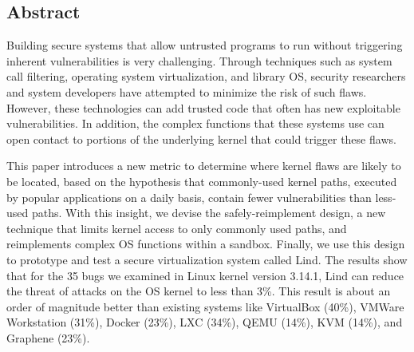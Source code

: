 \subsection*{Abstract}
Building secure systems that allow untrusted programs to run without
triggering inherent vulnerabilities %
is very challenging.
Through techniques such as system call filtering,
operating system virtualization, and library OS, security researchers
and system developers have attempted to minimize the risk of such flaws.
However, these technologies can add trusted code that often has new
exploitable vulnerabilities. 
In addition, the complex functions that these systems use can open contact 
to portions of the underlying kernel that could trigger these flaws.

This paper introduces a new metric to determine where kernel flaws are
likely to be located, based on the  hypothesis that commonly-used kernel
paths, executed by popular applications on a daily basis, contain fewer
vulnerabilities than less-used paths. With this insight, we devise the
safely-reimplement design, a new technique that limits kernel access to only
commonly used paths, and reimplements complex OS functions within a sandbox. 
Finally, we use this design to prototype and test a secure virtualization system called Lind.
The results show that for the 35 bugs we examined in Linux kernel version 3.14.1, 
Lind can reduce the threat of attacks on the OS kernel to less than 3\%.
This result is about an order of magnitude better than existing systems like VirtualBox (40\%),
VMWare Workstation (31\%), Docker (23\%), LXC (34\%), QEMU (14\%), KVM (14\%), and Graphene (23\%).



